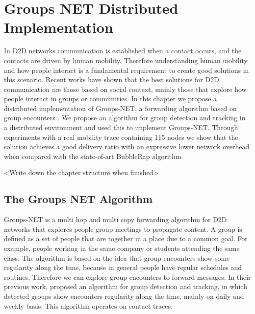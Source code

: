 \chapter{Groups NET Distributed Implementation}
\label{ch:GroupsNet}

In D2D networks communication is established when a contact occurs, and the contacts are driven by human mobility.
Therefore understanding human mobility and how people interact is a fundamental requirement to create good solutions in this scenario.
Recent works have shown that the best solutions for D2D communication are those based on social context, mainly those that explore how
people interact in groups or communities. In this chapter we propose a distributed implementation of Groups-NET, a forwarding algorithm
based on group encounters \cite{nunes2016leveraging}. We propose an algorithm for group detection and tracking in a distributed environment
and used this to implement Groups-NET. Through experiments with a real mobility trace containing 115 nodes we show that the solution achieves
a good delivery ratio with an expressive lower network overhead when compared with the state-of-art BubbleRap algorithm.

<Write down the chapter structure when finished>

\section{The Groups NET Algorithm}
\label{sec:groupsNet}

Groups-NET is a multi hop and multi copy forwarding algorithm for D2D networks that explores people group meetings to propagate content.
A group is defined as a set of people that are together in a place due to a common goal. For example, people working in the same company or students attending the same class.
The algorithm is based on the idea that group encounters show some regularity along the time, because in general people have regular schedules and routines. Therefore we
can explore group encounters to forward messages. In their previous work, \citet{groupMobility} proposed an algorithm for group detection and tracking, in which
detected groups show encounters regularity along the time, mainly on daily and weekly basis. This algorithm operates on contact traces.

